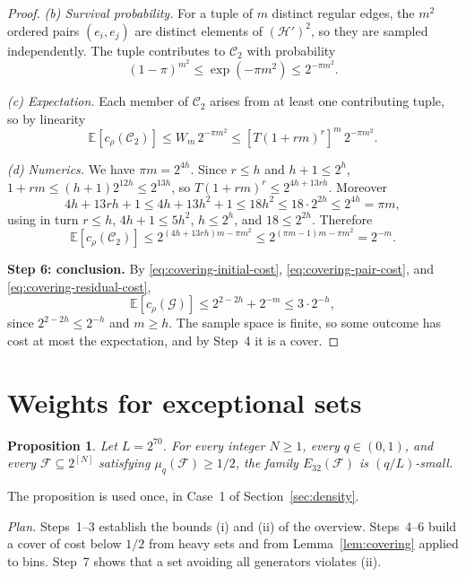 \documentclass[11pt,letterpaper]{article}
\newtheorem{proposition}[theorem]{Proposition}
\theoremstyle{definition}
\theoremstyle{remark}
\numberwithin{equation}{section}
\begin{document}
\begin{proof}
\emph{(b) Survival probability.} For a tuple of $m$ distinct regular edges, the $m^2$ ordered pairs $(e_i,e_j)$ are distinct elements of $(\mathcal H')^2$, so they are sampled independently. The tuple contributes to $\mathcal C_2$ with probability
\[
(1-\pi)^{m^2}\le\exp(-\pi m^2)\le2^{-\pi m^2}.
\]

\emph{(c) Expectation.} Each member of $\mathcal C_2$ arises from at least one contributing tuple, so by linearity
\[
\mathbb E[c_\rho(\mathcal C_2)]
\le W_m\,2^{-\pi m^2}\le[T(1+rm)^r]^m\,2^{-\pi m^2}.
\]

\emph{(d) Numerics.} We have $\pi m=2^{4h}$. Since $r\le h$ and $h+1\le2^h$, $1+rm\le(h+1)2^{12h}\le2^{13h}$, so $T(1+rm)^r\le2^{4h+13rh}$. Moreover
\[
4h+13rh+1\le4h+13h^2+1\le18h^2\le18\cdot2^{2h}\le2^{4h}=\pi m,
\]
using in turn $r\le h$, $4h+1\le5h^2$, $h\le2^h$, and $18\le2^{2h}$. Therefore
\begin{equation}\label{eq:covering-residual-cost}
\mathbb E[c_\rho(\mathcal C_2)]
\le2^{(4h+13rh)m-\pi m^2}\le2^{(\pi m-1)m-\pi m^2}=2^{-m}.
\end{equation}

\medskip\noindent\textbf{Step 6: conclusion.}
By \eqref{eq:covering-initial-cost}, \eqref{eq:covering-pair-cost}, and \eqref{eq:covering-residual-cost},
\[
\mathbb E[c_\rho(\mathcal G)]
\le2^{2-2h}+2^{-m}\le3\cdot2^{-h},
\]
since $2^{2-2h}\le2^{-h}$ and $m\ge h$. The sample space is finite, so some outcome has cost at most the expectation, and by Step~4 it is a cover.
\end{proof}

\section{Weights for exceptional sets}
\label{sec:weights}

\begin{proposition}\label{prop:half-density}
Let $L=2^{70}$. For every integer $N\ge1$, every $q\in(0,1)$, and every
$\mathcal F\subseteq 2^{[N]}$ satisfying $\mu_q(\mathcal F)\ge1/2$,
the family $E_{32}(\mathcal F)$ is $(q/L)$-small.
\end{proposition}

The proposition is used once, in Case~1 of Section~\ref{sec:density}.

\emph{Plan.} Steps~1--3 establish the bounds (i) and (ii) of the overview. Steps~4--6 build a cover of cost below $1/2$ from heavy sets and from Lemma~\ref{lem:covering} applied to bins. Step~7 shows that a set avoiding all generators violates (ii).
\end{document}
